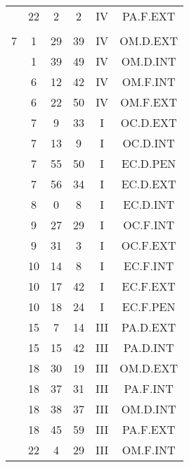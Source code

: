 \documentclass[12pt, a4paper]{article}
\begin{document}
\begin{multicols}{3}
{\begin{tabular}{c c c c c c}
	 	 	 	 & 22 & 2 & 2 & IV & PA.F.EXT\\%
	 	 	 	 & & & & & \\%
	 	 	 	7 & 1 & 29 & 39 & IV & OM.D.EXT\\%
	 	 	 	 & 1 & 39 & 49 & IV & OM.D.INT\\%
	 	 	 	 & 6 & 12 & 42 & IV & OM.F.INT\\%
	 	 	 	 & 6 & 22 & 50 & IV & OM.F.EXT\\%
	 	 	 	 & 7 & 9 & 33 & I & OC.D.EXT\\%
	 	 	 	 & 7 & 13 & 9 & I & OC.D.INT\\%
	 	 	 	 & 7 & 55 & 50 & I & EC.D.PEN\\%
	 	 	 	 & 7 & 56 & 34 & I & EC.D.EXT\\%
	 	 	 	 & 8 & 0 & 8 & I & EC.D.INT\\%
	 	 	 	 & 9 & 27 & 29 & I & OC.F.INT\\%
	 	 	 	 & 9 & 31 & 3 & I & OC.F.EXT\\%
	 	 	 	 & 10 & 14 & 8 & I & EC.F.INT\\%
	 	 	 	 & 10 & 17 & 42 & I & EC.F.EXT\\%
	 	 	 	 & 10 & 18 & 24 & I & EC.F.PEN\\%
	 	 	 	 & 15 & 7 & 14 & III & PA.D.EXT\\%
	 	 	 	 & 15 & 15 & 42 & III & PA.D.INT\\%
	 	 	 	 & 18 & 30 & 19 & III & OM.D.EXT\\%
	 	 	 	 & 18 & 37 & 31 & III & PA.F.INT\\%
	 	 	 	 & 18 & 38 & 37 & III & OM.D.INT\\%
	 	 	 	 & 18 & 45 & 59 & III & PA.F.EXT\\%
	 	 	 	 & 22 & 4 & 29 & III & OM.F.INT\\%

\end{tabular}}
\end{multicols}
\end{document}
